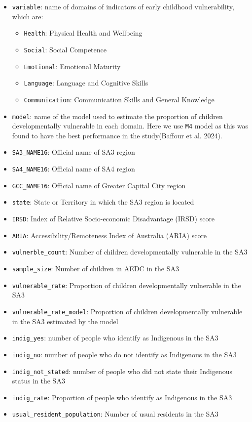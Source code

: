 \documentclass[
  letterpaper,
  DIV=11,
  numbers=noendperiod]{scrartcl}
\providecommand{\tightlist}{%
  \setlength{\itemsep}{0pt}\setlength{\parskip}{0pt}}\usepackage{longtable,booktabs,array}
\begin{document}
\begin{itemize}
\tightlist
\item
  \texttt{variable}: name of domains of indicators of early childhood
  vulnerability, which are:

  \begin{itemize}
  \tightlist
  \item
    \texttt{Health}: Physical Health and Wellbeing
  \item
    \texttt{Social}: Social Competence
  \item
    \texttt{Emotional}: Emotional Maturity
  \item
    \texttt{Language}: Language and Cognitive Skills
  \item
    \texttt{Communication}: Communication Skills and General Knowledge
  \end{itemize}
\item
  \texttt{model}: name of the model used to estimate the proportion of
  children developmentally vulnerable in each domain. Here we use
  \texttt{M4} model as this was found to have the best performance in
  the study(Baffour et al. 2024).
\item
  \texttt{SA3\_NAME16}: Official name of SA3 region
\item
  \texttt{SA4\_NAME16}: Official name of SA4 region
\item
  \texttt{GCC\_NAME16}: Official name of Greater Capital City region
\item
  \texttt{state}: State or Territory in which the SA3 region is located
\item
  \texttt{IRSD}: Index of Relative Socio-economic Disadvantage (IRSD)
  score
\item
  \texttt{ARIA}: Accessibility/Remoteness Index of Australia (ARIA)
  score
\item
  \texttt{vulnerble\_count}: Number of children developmentally
  vulnerable in the SA3
\item
  \texttt{sample\_size}: Number of children in AEDC in the SA3
\item
  \texttt{vulnerable\_rate}: Proportion of children developmentally
  vulnerable in the SA3
\item
  \texttt{vulnerable\_rate\_model}: Proportion of children
  developmentally vulnerable in the SA3 estimated by the model
\item
  \texttt{indig\_yes}: number of people who identify as Indigenous in
  the SA3
\item
  \texttt{indig\_no}: number of people who do not identify as Indigenous
  in the SA3
\item
  \texttt{indig\_not\_stated}: number of people who did not state their
  Indigenous status in the SA3
\item
  \texttt{indig\_rate}: Proportion of people who identify as Indigenous
  in the SA3
\item
  \texttt{usual\_resident\_population}: Number of usual residents in the
  SA3
\end{itemize}
\end{document}
